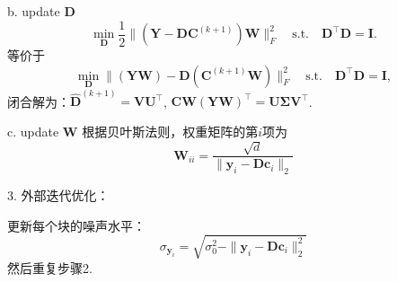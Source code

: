 \documentclass[10pt,twocolumn,letterpaper]{article}
\begin{document}
b. update $\mathbf{D}$
\begin{equation}
\min_{\mathbf{D}}\frac{1}{2}\|(\mathbf{Y}-\mathbf{D}\mathbf{C}^{(k+1)})\mathbf{W}\|_{F}^{2}
\quad
\text{s.t.}
\quad
\mathbf{D}^{\top}\mathbf{D} =\mathbf{I}. 
\end{equation}
等价于
\begin{equation}
\min_{\mathbf{D}}\|(\mathbf{Y}\mathbf{W})-\mathbf{D}(\mathbf{C}^{(k+1)}\mathbf{W})\|_{F}^{2}
\quad
\text{s.t.}
\quad
\mathbf{D}^{\top}\mathbf{D} = \mathbf{I},
\end{equation}
闭合解为：$\hat{\mathbf{D}}^{(k+1)}=\mathbf{V}\mathbf{U}^{\top}$, $\mathbf{C}\mathbf{W}(\mathbf{Y}\mathbf{W})^{\top}=\mathbf{U}\mathbf{\Sigma}\mathbf{V}^{\top}$.

c. update $\mathbf{W}$
根据贝叶斯法则，权重矩阵的第$i$项为
\begin{equation}
\mathbf{W}_{ii} 
=\frac{\sqrt{d}}{\|\mathbf{y}_{i}-\mathbf{D}\mathbf{c}_{i}\|_{2}}
\end{equation}


3. 外部迭代优化：

更新每个块的噪声水平：
\begin{equation}
\sigma_{\mathbf{y}_{i}} = \sqrt{\sigma_{0}^{2} - \|\mathbf{y}_{i}-\mathbf{D}\mathbf{c}_{i}\|_{2}^{2}}
\end{equation}
然后重复步骤2.


{
\small


}
\end{document}
